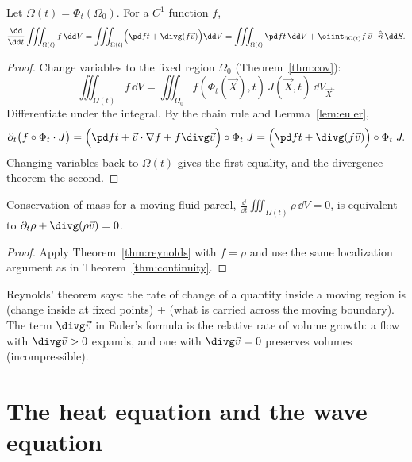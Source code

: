 \begin{theorem}\label{thm:reynolds}
Let $\Omega(t)=\Phi_t(\Omega_0)$. For a $C^1$ function $f$,
\[
\frac{\dd}{\dd t}\iiint_{\Omega(t)}f\,\dd V=\iiint_{\Omega(t)}\Bigl(\pd ft+\divg(f\vec v)\Bigr)\dd V=\iiint_{\Omega(t)}\pd ft\,\dd V+\oiint_{\partial\Omega(t)}f\,\vec v\cdot\hat{\vec n}\,\dd S .
\]
\end{theorem}

\begin{proof}
Change variables to the fixed region $\Omega_0$ (Theorem~\ref{thm:cov}):
\[
\iiint_{\Omega(t)}f\,\dd V=\iiint_{\Omega_0}f(\Phi_t(\vec X),t)\,J(\vec X,t)\,\dd V_{\vec X}.
\]
Differentiate under the integral. By the chain rule and Lemma~\ref{lem:euler},
\[
\partial_t\bigl(f\circ\Phi_t\cdot J\bigr)=\Bigl(\pd ft+\vec v\cdot\nabla f+f\divg\vec v\Bigr)\circ\Phi_t\;J=\Bigl(\pd ft+\divg(f\vec v)\Bigr)\circ\Phi_t\;J .
\]
Changing variables back to $\Omega(t)$ gives the first equality, and the divergence theorem the second.
\end{proof}

\begin{corollary}\label{cor:masscons}
Conservation of mass for a moving fluid parcel, $\frac{\dd}{\dd t}\iiint_{\Omega(t)}\rho\,\dd V=0$, is equivalent to $\partial_t\rho+\divg(\rho\vec v)=0$.
\end{corollary}

\begin{proof}
Apply Theorem~\ref{thm:reynolds} with $f=\rho$ and use the same localization argument as in Theorem~\ref{thm:continuity}.
\end{proof}

\begin{intuition}
Reynolds' theorem says: the rate of change of a quantity inside a moving region is (change inside at fixed points) + (what is carried across the moving boundary). The term $\divg\vec v$ in Euler's formula is the relative rate of volume growth: a flow with $\divg\vec v>0$ expands, and one with $\divg\vec v=0$ preserves volumes (incompressible).
\end{intuition}

\section{The heat equation and the wave equation}


